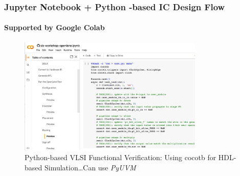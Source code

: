 \documentclass[xcolor={usenames,dvipsnames},hyperref={hyperindex,bookmarks}]{beamer}
\begin{document}
\begin{frame}
	\frametitle{Jupyter Notebook + Python -based IC Design Flow}
	\framesubtitle{Supported by Google Colab}
	
	\begin{figure}
		\centering
		\includegraphics[height=2.2in]{./pics/JupyterNotebookICDesign2}
		\caption{Python-based VLSI Functional Verification: Using cocotb for HDL-based Simulation\dots Can use {\it PyUVM}}
	\end{figure}
\end{frame}
\end{document}
